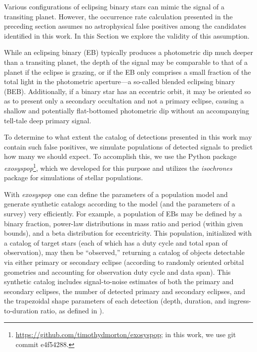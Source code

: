 \documentclass[manuscript, letterpaper]{aastex6}
\makeatletter
\let\origsection\section
\renewcommand\section{\@ifstar{\starsection}{\nostarsection}}
\newcommand\nostarsection[1]{\sectionprelude\origsection{#1}}
\newcommand\starsection[1]{\sectionprelude\origsection*{#1}}
\newcommand\sectionprelude{\vspace{1em}}
\newcommand{\project}[1]{\textsl{#1}}
\newcommand{\exosyspop}{\project{exosyspop}}
\newcommand{\sectlabel}[1]{\label{sect:#1}}
\makeatother
\begin{document}
\section{Astrophysical false positives}\sectlabel{false-positives}


Various configurations of eclipsing binary stars can mimic the signal of a
transiting planet.  However, the occurrence rate calculation
presented in the preceding section assumes no astrophysical false positives
among the candidates identified in this work.  In this Section we explore the
validity of this assumption.

While an eclipsing binary (EB) typically produces a photometric dip much
deeper than a transiting planet, the depth of the signal may be comparable to
that of a planet if the eclipse is grazing, or if the EB only comprises a small
fraction of the total light in the photometric aperture---a so-called blended
eclipsing binary (BEB).  Additionally, if a binary star has an eccentric
orbit, it may be oriented so as to present only a secondary occultation and
not a primary eclipse, causing a shallow and potentially flat-bottomed
photometric dip without an accompanying tell-tale deep primary signal.

To determine to what extent the catalog of detections presented in this work
may contain such false positives, we simulate populations of detected signals
to predict how many we should expect.  To accomplish this, we use the Python
package
\exosyspop\footnote{\url{https://github.com/timothydmorton/exosyspop}; in this
work, we use git commit \textsf{e4f54288}.}, which
we developed for this purpose and utilizes the \project{isochrones}
package \citep{Morton:2015} for simulations of stellar populations.

With \exosyspop\, one can define the parameters of a population model and
generate synthetic catalogs according to the model (and the parameters of a
survey) very efficiently.  For example, a population of EBs may be defined by
a binary fraction, power-law distributions in mass ratio and period (within
given bounds), and a beta distribution for eccentricity.  This population,
initialized with a catalog of target stars (each of which has a duty cycle and
total span of observation), may then be ``observed,'' returning a catalog of
objects detectable via either primary or secondary eclipse (according to
randomly oriented orbital geometries and accounting for observation duty cycle
and data span).  This synthetic catalog includes signal-to-noise estimates of
both the primary and secondary eclipses, the number of detected primary and
secondary eclipses, and the trapezoidal shape parameters of each detection
(depth, duration, and ingress-to-duration ratio, as defined in
\citealt{Morton:2012}).
\end{document}
